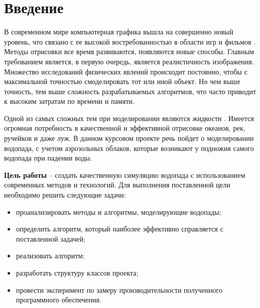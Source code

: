 \chapter*{Введение}


В современном мире компьютерная графика вышла на совершенно новый уровень, что связано с ее высокой востребованностью в области игр и фильмов \cite{realistic-water}. Методы отрисовки все время развиваются, появляются новые способы. Главным требованием является, в первую очередь, является реалистичность изображения. Множество исследований физических явлений происходит постоянно, чтобы с максимальной точностью смоделировать тот или иной объект. Но чем выше точность, тем выше сложность разрабатываемых алгоритмов, что часто приводит к высоким затратам по времени и памяти.

Одной из самых сложных тем при моделировании являются жидкости \cite{water-matters}. Имеется огромная потребность в качественной и эффективной отрисовке океанов, рек, ручейков и даже луж. В данном курсовом проекте речь пойдет о моделировании водопада, с учетом аэрозольных облаков, которые возникают у подножия самого водопада при падении воды.

\textbf{Цель работы} -- создать качественную симуляцию водопада с использованием современных методов и технологий. Для выполнения поставленной цели необходимо решить следующие задачи:

\begin{itemize}
	\item проанализировать методы и алгоритмы, моделирующие водопады; 
	\item определить алгоритм, который наиболее эффективно справляется с поставленной задачей; 
	\item реализовать алгоритм;
	\item разработать структуру классов проекта;
	\item провести эксперимент по замеру производительности полученного программного обеспечения.
\end{itemize}
